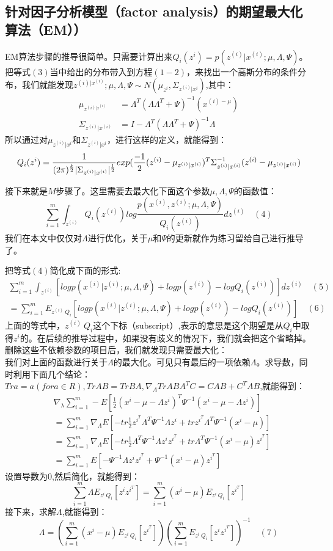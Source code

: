 \documentclass[14pt,a4paper]{article}
\begin{document}
\begin{spacing}{1.5}
\subsection{针对因子分析模型（factor analysis）的期望最大化算法（EM））}
EM算法步骤的推导很简单。只需要计算出来$Q_{i}(z^{i})=p(z^{(i)}|x^{(i)};\mu,\Lambda,\Psi)$。把等式$(3)$当中给出的分布带入到方程$(1-2)$，来找出一个高斯分布的条件分布，我们就能发现$z^{(i)|x^{(i)}};\mu,\Lambda,\Psi \sim N(\mu_{z^{i}},\Sigma_{z^{(i)}|x^{i}})$,其中：
$$
\begin{aligned}
\mu_{z^{(i)|x^{(i)}}}&=\Lambda^{T}(\Lambda\Lambda^{T}+\Psi)^{-1}(x^{(i)-\mu})\\
\Sigma_{z^{(i)}|x^{{(i)}}}&=I-\Lambda^{T}(\Lambda\Lambda^{T}+\Psi)^{-1}\Lambda
\end{aligned}
$$
所以通过对$\mu_{z^{(i)}|x^{i}}$和$\Sigma_{z^{(i)}|x^{i}}$，进行这样的定义，就能得到：
$$
Q_{i}(z^{i})=\frac{1}{(2\pi)^{k\over 2}|\Sigma_{z^{(i)}|x^{(i)}}|^{\frac{1}{2}}}exp(\frac{-1}{2}(z^{(i)}-\mu_{z^{(i)}|x^{(i)}})^{T}\Sigma_{z^{(i)}|x^{(i)}}^{-1}(z^{(i)}-\mu_{z^{(i)}|x^{(i)}})
$$

接下来就是$ M $步骤了。这里需要去最大化下面这个参数$\mu,\Lambda,\Psi $的函数值：
$$
\sum_{i=1}^{m}\int_{z^{(i)}}Q_{i}(z^{(i)})log\frac{p(x^{(i)},z^{(i)};\mu,\Lambda,\Psi)}{Q_{i}(z^{(i)})}dz^{(i)}\quad (4)
$$
我们在本文中仅仅对$\Lambda$进行优化，关于$\mu$和$\Psi$的更新就作为练习留给自己进行推导了。

把等式$(4)$简化成下面的形式:
$$
\begin{aligned}
\sum_{i=1}^{m}\int_{z^{(i)}}[log p(x^{(i)}|z^{(i)};\mu,\Lambda,\Psi)+logp(z^{(i)})-logQ_i(z^{(i)})]dz^{(i)} \quad (5) \\
=\sum_{i=1}^{m}E_{z^{(i)}~Q_i}[log p(x^{(i)}|z^{(i)};\mu,\Lambda,\Psi)+log p(z^{(i)})-log Q_{i}(z^{(i)})] \quad(6)
\end{aligned}
$$
上面的等式中，$z^{(i)}~Q_{i}$这个下标（subscript）,表示的意思是这个期望是从$Q_{i}$中取得$z^{i}$的。在后续的推导过程中，如果没有歧义的情况下，我们就会把这个省略掉。删除这些不依赖参数的项目后，我们就发现只需要最大化：
$$$$
我们对上面的函数进行关于$\Lambda$的最大化。可见只有最后的一项依赖$\Lambda$。求导数，同时利用下面几个结论：$Tr a=a(for a \in R),Tr AB=Tr BA,\nabla_{A}Tr ABA^{T}C=CAB+C^{T}AB$,就能得到：
$$
\begin{aligned}
 &\nabla_{\lambda}\sum_{i=1}^{m}-E[\frac{1}{2}(x^{i}-\mu-\Lambda z^{i})^{T}\Psi^{-1}(x^{i}-\mu-\Lambda z^{i})]\\
 &=\sum_{i=1}^{m}\nabla_{\Lambda}E[-tr\frac{1}{2}z^{i^{T}}\Lambda^{T}\Psi^{-1}\Lambda z^{i}+trz^{i^{T}}\Lambda ^{T}\Psi^{-1}(x^{i}-\mu)]\\
 &=\sum_{i=1}^{m}\nabla_{\Lambda}E[-tr\frac{1}{2}\Lambda^{T}\Psi^{-1}\Lambda z^{i}z^{i^{T}}+tr\Lambda ^{T}\Psi^{-1}(x^{i}-\mu)z^{i^{T}}]\\
 &=\sum_{i=1}^{m}E[-\Psi^{-1}\Lambda z^{i}z^{i^{T}}+\Psi^{-1}(x^{i}-\mu)z^{i^{T}}]
\end{aligned}
$$
设置导数为$0$,然后简化，就能得到：
$$
\sum_{i=1}^{m}\Lambda E_{z^{i}~Q_{i}}[z^{i}z^{i^{T}}]=\sum_{i=1}^{m}(x^{i}-\mu)E_{z^{i}~Q_{i}}[z^{i^{T}}]
$$
接下来，求解$\Lambda$,就能得到：
$$\Lambda=(\sum_{i=1}^{m}(x^{i}-\mu)E_{z^{i}~Q_{i}}[z^{i^{T}}])(\sum_{i=1}^{m}E_{z^{i}~Q_{i}}[z^{i}z^{i^{T}}])^{-1} \quad(7)$$


\end{spacing}
\end{document}
